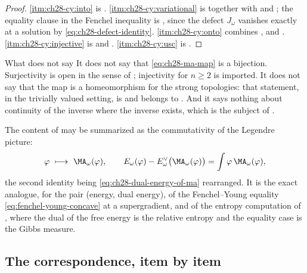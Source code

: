 \begin{proof}
\cref{itm:ch28-cy:into} is .
\cref{itm:ch28-cy:variational} is
 together with
 and
; the equality clause in the
Fenchel inequality is , since the defect
$J_\omega$ vanishes exactly at a solution by
\eqref{eq:ch28-defect-identity}.  \cref{itm:ch28-cy:onto} combines
,
 and
.  \cref{itm:ch28-cy:injective} is
 and
.  \cref{itm:ch28-cy:usc} is
.
\end{proof}

\begin{warning}{What  does not say}
It does not say that \eqref{eq:ch28-ma-map} is a bijection.  Surjectivity is
open in the sense of ; injectivity for
$n\geq2$ is imported.  It does not say that the map is a homeomorphism for
the strong topologies: that statement, in the trivially valued setting, is
\cite[Theorem~12.8]{BJ22} and belongs to
.  And it says nothing about continuity of
the inverse where the inverse exists, which is the subject of
.
\end{warning}

\begin{remark}
\label{rem:ch28-correspondence-line}
The content of  may be summarized as the
commutativity of the Legendre picture:
\[
 \varphi\ \longmapsto\ \MA_\omega(\varphi),
 \qquad
 E_\omega(\varphi)-E^\vee_\omega\bigl(\MA_\omega(\varphi)\bigr)
 =\int\varphi\,\MA_\omega(\varphi),
\]
the second identity being \eqref{eq:ch28-dual-energy-of-ma} rearranged.  It
is the exact analogue, for the pair (energy, dual energy), of the
Fenchel--Young equality \eqref{eq:fenchel-young-concave} at a supergradient,
and of the entropy computation of , where the
dual of the free energy is the relative entropy and the equality case is the
Gibbs measure.
\end{remark}

\subsection{The correspondence, item by item}
\label{sec:ch28-cy-table}


